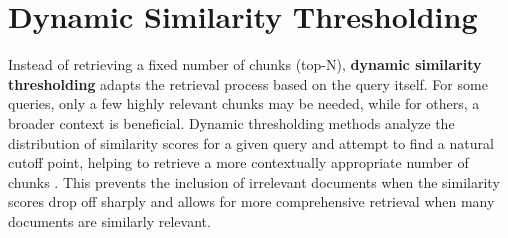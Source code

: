 \section{Dynamic Similarity Thresholding}
Instead of retrieving a fixed number of chunks (top-N), \textbf{dynamic similarity thresholding} adapts the retrieval process based on the query itself. For some queries, only a few highly relevant chunks may be needed, while for others, a broader context is beneficial. Dynamic thresholding methods analyze the distribution of similarity scores for a given query and attempt to find a natural cutoff point, helping to retrieve a more contextually appropriate number of chunks \autocite{dynamic_thresholding_dell_2023}. This prevents the inclusion of irrelevant documents when the similarity scores drop off sharply and allows for more comprehensive retrieval when many documents are similarly relevant.